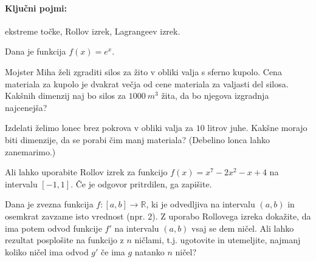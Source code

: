 \documentclass[11pt,a4paper]{exam}
\renewcommand{\geq}{\geqslant}
\renewcommand{\{}{\lbrace}
\renewcommand{\}}{\rbrace}
\begin{document}
\paragraph{Ključni pojmi:} ekstreme točke, Rollov izrek, Lagrangeev izrek.
\begin{questions}

	\question Dana je funkcija $f(x) = e^{x}$.

	 \question Mojster Miha želi zgraditi silos za žito v obliki valja s sferno kupolo. Cena materiala za kupolo je dvakrat večja od cene materiala za valjasti del silosa. Kakšnih dimenzij naj bo silos za $1000 \ { m}^3$ žita, da bo njegova izgradnja najcenejša?


			\question Izdelati želimo lonec brez pokrova v obliki valja za $10$ litrov juhe. Kakšne morajo biti dimenzije, da se porabi čim manj materiala? (Debelino lonca lahko zanemarimo.)

			\question Ali lahko uporabite Rollov izrek za funkcijo $f(x) = x^{7}-2x^2-x+4$ na intervalu $[-1,1]$. Če je odgovor pritrdilen, ga zapišite.

			\question Dana je zvezna funkcija $f: [a,b] \to \mathbb{R}$, ki je odvedljiva na intervalu $(a,b)$ in osemkrat zavzame isto vrednost (npr. 2). Z uporabo Rollovega izreka dokažite, da ima potem odvod funkcije $f'$ na intervalu $(a,b)$ vsaj se dem ničel. Ali lahko rezultat posplošite na funkcijo z $n$ ničlami, t.j. ugotovite in utemeljite, najmanj koliko ničel ima odvod $g'$ če ima $g$ natanko $n$ ničel?

			\question 
\end{questions}
\end{document}

